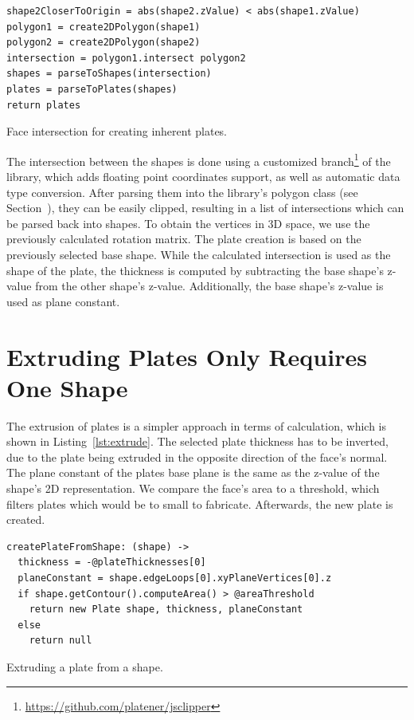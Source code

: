 \documentclass[../ClassicThesis.tex]{subfiles}
\begin{document}
\begin{listing}
\begin{verbatim}
shape2CloserToOrigin = abs(shape2.zValue) < abs(shape1.zValue)
polygon1 = create2DPolygon(shape1)
polygon2 = create2DPolygon(shape2)
intersection = polygon1.intersect polygon2
shapes = parseToShapes(intersection)
plates = parseToPlates(shapes)
return plates
\end{verbatim}
\caption{Face intersection for creating inherent plates.}
\label{lst:faceintersect}
\end{listing}

The intersection between the shapes is done using a customized branch\footnote{\url{https://github.com/platener/jsclipper}} of the {\jsclipper} library, which adds floating point coordinates support, as well as automatic data type conversion. After parsing them into the library's polygon class (see Section~), they can be easily clipped, resulting in a list of intersections which can be parsed back into shapes. To obtain the vertices in 3D space, we use the previously calculated rotation matrix. The plate creation is based on the previously selected base shape. While the calculated intersection is used as the shape of the plate, the thickness is computed by subtracting the base shape's z-value from the other shape's z-value. Additionally, the base shape's z-value is used as plane constant.

\section{Extruding Plates Only Requires One Shape}\label{sec:extrudedplates}

The extrusion of plates is a simpler approach in terms of calculation, which is shown in Listing~\ref{lst:extrude}. The selected plate thickness has to be inverted, due to the plate being extruded in the opposite direction of the face's normal. The plane constant of the plates base plane is the same as the z-value of the shape's 2D representation. We compare the face's area to a threshold, which filters plates which would be to small to fabricate. Afterwards, the new plate is created.

\begin{listing}
\begin{verbatim}
createPlateFromShape: (shape) ->
  thickness = -@plateThicknesses[0]
  planeConstant = shape.edgeLoops[0].xyPlaneVertices[0].z
  if shape.getContour().computeArea() > @areaThreshold
    return new Plate shape, thickness, planeConstant
  else
    return null
\end{verbatim}
\caption{Extruding a plate from a shape.}
\label{lst:extrude}
\end{listing}
\end{document}
